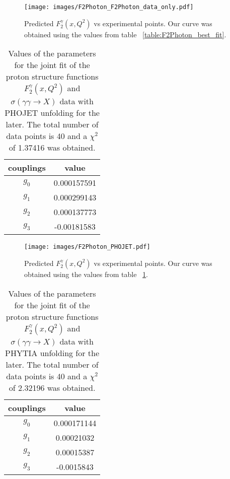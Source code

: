 \documentclass[preprint, 12pt]{elsarticle}
\begin{document}
\begin{figure}[!h]
\center
\texttt{[image: images/F2Photon\_F2Photon\_data\_only.pdf]} 
\caption{Predicted $F_2^\gamma\left(x, Q^2\right)$ vs experimental points. Our curve was obtained using the values from table ~\ref{table:F2Photon_best_fit}.}
\label{fig:F2Photon_best_fit_F2_data_only}
\end{figure}



\begin{table}[b!]
\centering
\caption{Values of the parameters for the joint fit of the proton structure functions $F_2^{\gamma}\left(x, Q^2\right)$ and $\sigma\left(\gamma \gamma \rightarrow X\right)$ data with PHOJET unfolding for the later. The total number of data points is 40 and a $\chi^2$ of 1.37416 was obtained.}
\vspace{0.5cm}
\begin{tabular}{|c|c|}
\hline
couplings   & value \\
\hline
$g_0$  & 0.000157591\\ 
\hline
$g_1$  & 0.000299143 \\ 
\hline
$g_2$  & 0.000137773  \\
\hline
$g_3$  & -0.00181583\\ 
\hline
\end{tabular}
\label{table:GammaGamma_best_fit_PHOJET}
\end{table}

\begin{figure}[!h]
\center
\texttt{[image: images/F2Photon\_PHOJET.pdf]} 
\caption{Predicted $F_2^\gamma\left(x, Q^2\right)$ vs experimental points. Our curve was obtained using the values from table ~\ref{table:GammaGamma_best_fit_PHOJET}.}
\label{fig:F2Photon_best_fit_PHOJET}
\end{figure}

\begin{table}[b!]
\centering
\caption{Values of the parameters for the joint fit of the proton structure functions $F_2^{\gamma}\left(x, Q^2\right)$ and $\sigma\left(\gamma \gamma \rightarrow X\right)$ data with PHYTIA unfolding for the later. The total number of data points is 40 and a $\chi^2$ of 2.32196 was obtained.}
\vspace{0.5cm}
\begin{tabular}{|c|c|}
\hline
couplings   & value \\
\hline
$g_0$  & 0.000171144\\ 
\hline
$g_1$  & 0.00021032 \\ 
\hline
$g_2$  & 0.00015387  \\
\hline
$g_3$  & -0.0015843\\ 
\hline
\end{tabular}
\label{table:GammaGamma_best_fit_PHYTIA}
\end{table}
\end{document}
